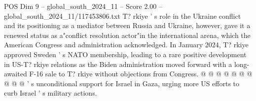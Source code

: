 \begin{textsample}{POS Dim 9 – global\_south\_2024\_11 – Score 2.00 – global\_south\_2024\_11/117453806.txt}
T? rkiye ' s role in the Ukraine conflict and its positioning as a mediator between Russia and Ukraine, however, gave it a renewed status as a"conflict resolution actor"in the international arena, which the American Congress and administration acknowledged.
In January 2024, T? rkiye approved Sweden ' s NATO membership, leading to a rare positive development in US-T? rkiye relations as the Biden administration moved forward with a long-awaited F-16 sale to T? rkiye without objections from Congress. @ @ @ @ @ @ @ @ @ @ ' s unconditional support for Israel in Gaza, urging more US efforts to curb Israel ' s military actions.

\end{textsample}
